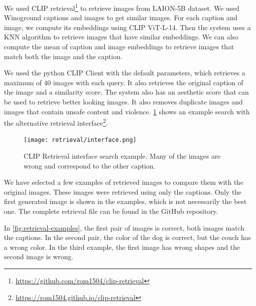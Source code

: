 We used CLIP retrieval\footnote{\url{https://github.com/rom1504/clip-retrieval}} to retrieve images from LAION-5B \cite{schuhmann2022laionb} dataset. We used Winoground captions and images to get similar images. For each caption and image, we compute its embeddings using CLIP ViT-L-14. Then the system uses a KNN algorithm to retrieve images that have similar embeddings. We can also compute the mean of caption and image embeddings to retrieve images that match both the image and the caption. 

We used the python CLIP Client with the default parameters, which retrieves a maximum of 40 images with each query. It also retrieves the original caption of the image and a similarity score. The system also has an aesthetic score that can be used to retrieve better looking images. It also removes duplicate images and images that contain unsafe content and violence. \cref{fig:retrieval_interface} shows an example search with the alternative retrieval interface\footnote{\url{https://rom1504.github.io/clip-retrieval}}.

\begin{figure}[ht]
    \centering
    \texttt{[image: retrieval/interface.png]}
    \caption{CLIP Retrieval interface search example. Many of the images are wrong and correspond to the other caption.}
    \label{fig:retrieval_interface}
\end{figure}

We have selected a few examples of retrieved images to compare them with the original images. These images were retrieved using only the captions. Only the first generated image is shown in the examples, which is not necessarily the best one. The complete retrieval file can be found in the GitHub repository.

In \cref{fig:retrieval-examples}, the first pair of images is correct, both images match the captions. In the second pair, the color of the dog is correct, but the couch has a wrong color. In the third example, the first image has wrong shapes and the second image is wrong.

